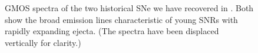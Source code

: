 \begin{figure}
\caption{GMOS spectra of the two historical SNe we have recovered in \gal.  Both show the broad emission lines characteristic of young SNRs with rapidly expanding ejecta.  (The spectra have been displaced vertically for clarity.) \label{historical_SNe}}
\end{figure}











